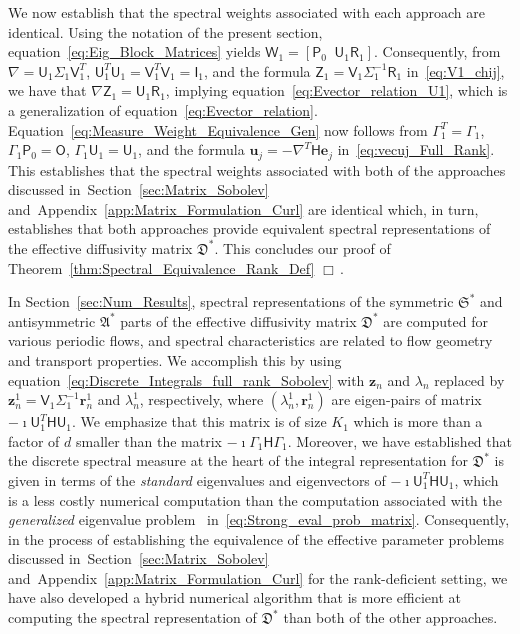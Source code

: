 \documentclass[english,12pt,jmp,graphicx]{revtex4-1}
\newcommand{\vecu}{\boldsymbol{u}}
\newcommand{\vecz}{\boldsymbol{z}}
\newcommand{\vece}{\boldsymbol{e}}
\newcommand{\thmref}[1]{Theorem~\ref{#1}}
\newcommand{\secref}[1]{Section~\ref{#1}}
\newcommand{\appref}[1]{Appendix~\ref{#1}}
\newcommand{\Sg}{\mathfrak{S}}
\newcommand{\Ag}{\mathfrak{A}}
\newcommand{\Dg}{\mathfrak{D}}
\newcommand{\vecr}{\boldsymbol{r}}
\newcommand{\Hm}{\mathsf{H}}
\newcommand{\Um}{\mathsf{U}}
\newcommand{\Vm}{\mathsf{V}}
\newcommand{\Zm}{\mathsf{Z}}
\newcommand{\Wm}{\mathsf{W}}
\newcommand{\Pm}{\mathsf{P}}
\newcommand{\Rm}{\mathsf{R}}
\newcommand{\Ib}{\mathsf{I}}
\newcommand{\Om}{\mathsf{O}}
\begin{document}
We now establish that the spectral weights associated with each
approach are identical.
Using the notation of the present section,
equation~\eqref{eq:Eig_Block_Matrices} yields
$\Wm_1=[\Pm_0\;\;\Um_1\Rm_1]$.
Consequently, from
$\nabla=\Um_1\Sigma_1\Vm_1^T$,
$\Um_1^T\Um_1=\Vm_1^T\Vm_1=\Ib_1$,
and the formula
$\Zm_1=\Vm_1\Sigma_1^{-1}\Rm_1$ in~\eqref{eq:V1_chij}, we have that
$\nabla\Zm_1=\Um_1\Rm_1$, implying
equation~\eqref{eq:Evector_relation_U1}, which is a generalization of
equation~\eqref{eq:Evector_relation}. Equation~\eqref{eq:Measure_Weight_Equivalence_Gen}
now follows from $\Gamma_1^T=\Gamma_1$, $\Gamma_1\Pm_0=\Om$,
$\Gamma_1\Um_1=\Um_1$, and the 
formula $\vecu_j=-\nabla^T\Hm\vece_j$ in~\eqref{eq:vecuj_Full_Rank}.
This establishes that the spectral weights associated with both of the 
approaches discussed in~\secref{sec:Matrix_Sobolev}
and~\appref{app:Matrix_Formulation_Curl} are identical which, in turn, 
establishes that both approaches provide equivalent spectral
representations of the effective diffusivity matrix $\Dg^*$.
This concludes our proof of \thmref{thm:Spectral_Equivalence_Rank_Def}
$\Box\,.$ 


In \secref{sec:Num_Results}, spectral representations of the symmetric
$\Sg^*$ and antisymmetric 
$\Ag^*$ parts of the effective diffusivity matrix $\Dg^*$ are computed
for various periodic flows, and spectral characteristics are related
to flow geometry and transport properties. We accomplish this by using  
equation~\eqref{eq:Discrete_Integrals_full_rank_Sobolev} with 
$\vecz_n$ and $\lambda_n$ replaced by
$\vecz_n^1=\Vm_1\Sigma_1^{-1}\vecr_n^1$ and $\lambda^1_n$,
respectively, where $(\lambda^1_n,\vecr_n^1)$ are eigen-pairs of
matrix $-\imath\Um_1^T\Hm\Um_1$. We emphasize that this matrix is of
size $K_1$ which is more than a factor of $d$ smaller than the matrix
$-\imath\Gamma_1\Hm\Gamma_1$. Moreover, we have established that the discrete
spectral measure at the heart of the integral representation for
$\Dg^*$ is given in terms of the \emph{standard} eigenvalues and
eigenvectors of $-\imath\Um_1^T\Hm\Um_1$, which is a less costly
numerical computation than the computation associated with the 
\emph{generalized} eigenvalue problem~\cite{Parlett:1980}
in~\eqref{eq:Strong_eval_prob_matrix}. Consequently, in the process of 
establishing the equivalence of the effective parameter problems
discussed in~\secref{sec:Matrix_Sobolev}
and~\appref{app:Matrix_Formulation_Curl} for the rank-deficient setting, we
have also developed a hybrid numerical algorithm that is more
efficient at computing the spectral representation of $\Dg^*$ than
both of the other approaches.  











%

\end{document}
